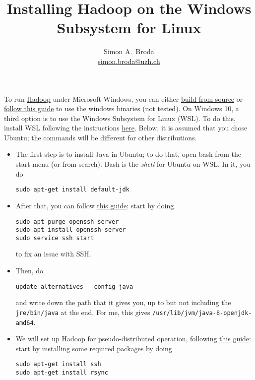 \documentclass[11pt,a4paper]{article}
\title{Installing Hadoop on the Windows Subsystem for Linux}
\author{Simon A.\ Broda\\\href{mailto:simon.broda@uzh.ch}{simon.broda@uzh.ch}}
\begin{document}
\maketitle
To run \href{https://hadoop.apache.org/}{Hadoop} under Microsoft Windows, you can either \href{https://wiki.apache.org/hadoop/Hadoop2OnWindows}{build from source} or \href{https://github.com/MuhammadBilalYar/Hadoop-On-Window/wiki/Step-by-step-Hadoop-2.8.0-installation-on-Window-10}{follow this guide} to use the windows binaries (not tested). On Windows 10, a third option is to use the Windows Subsystem for Linux (WSL).
To do this, install WSL following the instructions  \href{https://docs.microsoft.com/en-us/windows/wsl/install-win10}{here}. Below, it is assumed that you chose Ubuntu; the commands will be different for other distributions.
\begin{itemize}
\item The first step is to install Java in Ubuntu; to do that, open bash from the start menu (or from search). Bash is the \emph{shell} for Ubuntu on WSL. In it, you do

\verb+sudo apt-get install default-jdk+

\item After that, you can follow \href{https://jonboulineau.me/blog/hadoop/hadoop-on-wsl}{this guide}: start by doing
\begin{verbatim}
sudo apt purge openssh-server
sudo apt install openssh-server
sudo service ssh start
\end{verbatim}
to fix an issue with SSH.

\item Then, do

\verb+update-alternatives --config java+

and write down the path that it gives you, up to but not including the \verb+jre/bin/java+ at the end. For me, this gives \verb+/usr/lib/jvm/java-8-openjdk-amd64+.

\item We will set up Hadoop for pseudo-distributed operation, following \href{https://hadoop.apache.org/docs/stable/hadoop-project-dist/hadoop-common/SingleCluster.html}{this guide}: start by installing some required packages by doing
\begin{verbatim}
sudo apt-get install ssh
sudo apt-get install rsync
\end{verbatim}


\end{itemize}
\end{document}
